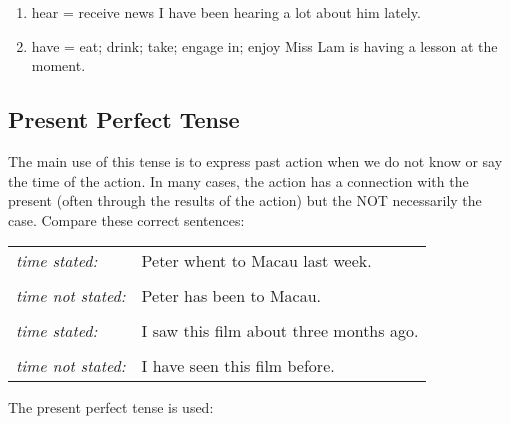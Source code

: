 \begin{enumerate}
\begin{enumerate}
\begin{enumerate}
                    \item hear = receive news
                        \newline
                        \newline
                        I have been hearing a lot about him lately.
                    \item have = eat; drink; take; engage in; enjoy
                        \newline
                        \newline
                        Miss Lam is having a lesson at the moment.
                \end{enumerate}
        \end{enumerate}
\end{enumerate}

\newpage
\subsection{Present Perfect Tense}
The main use of this tense is to express past action when we do not know or say
the time of the action.
In many cases, the action has a connection with the present (often through the
results of the action) but the NOT necessarily the case.
Compare these correct sentences:
\newline
\begin{tabular}{ll}
    \it{time stated:} & Peter whent to Macau last week. \\ & \\
    \it{time not stated:} & Peter has been to Macau. \\ & \\
    \it{time stated:} & I saw this film about three months ago. \\ & \\
    \it{time not stated:} & I have seen this film before.
\end{tabular}
\newline
\newline
The present perfect tense is used:
